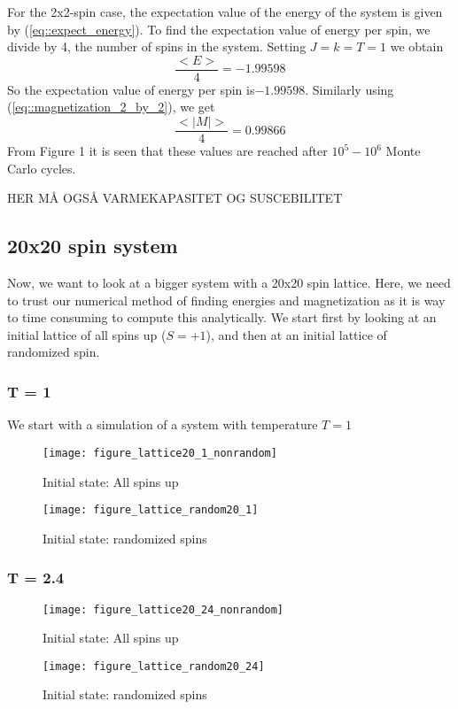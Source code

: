 \documentclass[12pt]{article}
\begin{document}
For the 2x2-spin case, the expectation value of the energy of the system is given by (\ref{eq::expect_energy}). To find the expectation value of energy per spin, we divide by 4,  the number of spins in the system. Setting $J = k = T = 1  $ we obtain 
\begin{equation*}
\frac{<E>}{4} = -1.99598
\end{equation*}
So the expectation value of energy per spin is$-1.99598$. 
Similarly using (\ref{eq::magnetization_2_by_2}), we get 
\begin{equation*}
\frac{<|M|>}{4} = 0.99866
\end{equation*}
From Figure 1 it is seen that these values are reached after $10^5-10^6$ Monte Carlo cycles. 

HER MÅ OGSÅ VARMEKAPASITET OG SUSCEBILITET

\subsection{20x20 spin system}
Now, we want to look at a bigger system with a 20x20 spin lattice. Here, we need to trust our numerical method of finding energies and magnetization as it is way to time consuming to compute this analytically.  We start first by looking at an initial lattice of all spins up ($S = +1$), and then at an initial lattice of randomized spin. 
\subsubsection{T = 1}
We start with a simulation of a system with temperature $T=1$
\begin{figure}[H]
\texttt{[image: figure\_lattice20\_1\_nonrandom]}
\caption{Initial state: All spins up}
\end{figure}


\begin{figure}[H]
\texttt{[image: figure\_lattice\_random20\_1]}
\caption{Initial state: randomized spins}
\end{figure}
\subsubsection{T = 2.4}
\begin{figure}[H]
\texttt{[image: figure\_lattice20\_24\_nonrandom]}
\caption{Initial state: All spins up}
\end{figure}



\begin{figure}[H]
\texttt{[image: figure\_lattice\_random20\_24]}
\caption{Initial state: randomized spins}
\end{figure}
\end{document}
